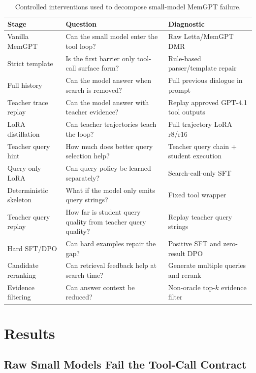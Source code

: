 \documentclass[11pt]{article}
\begin{document}
\begin{table}[t]
\centering
\small
\begin{tabularx}{\textwidth}{l X X}
\toprule
\textbf{Stage} & \textbf{Question} & \textbf{Diagnostic} \\
\midrule
Vanilla MemGPT & Can the small model enter the tool loop? & Raw Letta/MemGPT DMR \\
Strict template & Is the first barrier only tool-call surface form? & Rule-based parser/template repair \\
Full history & Can the model answer when search is removed? & Full previous dialogue in prompt \\
Teacher trace replay & Can the model answer with teacher evidence? & Replay approved GPT-4.1 tool outputs \\
LoRA distillation & Can teacher trajectories teach the loop? & Full trajectory LoRA r8/r16 \\
Teacher query hint & How much does better query selection help? & Teacher query chain + student execution \\
Query-only LoRA & Can query policy be learned separately? & Search-call-only SFT \\
Deterministic skeleton & What if the model only emits query strings? & Fixed tool wrapper \\
Teacher query replay & How far is student query quality from teacher query quality? & Replay teacher query strings \\
Hard SFT/DPO & Can hard examples repair the gap? & Positive SFT and zero-result DPO \\
Candidate reranking & Can retrieval feedback help at search time? & Generate multiple queries and rerank \\
Evidence filtering & Can answer context be reduced? & Non-oracle top-$k$ evidence filter \\
\bottomrule
\end{tabularx}
\caption{Controlled interventions used to decompose small-model MemGPT failure.}
\label{tab:ladder}
\end{table}

\section{Results}

\subsection{Raw Small Models Fail the Tool-Call Contract}
\end{document}
